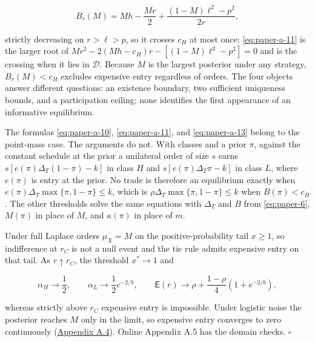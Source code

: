 \[
B_r(M)=Mh-\frac{Mr}{2}+\frac{(1-M)\ell^2-p^2}{2r},
\tag{A.13}\label{eq:paper-a-13}
\]

strictly decreasing on \(r>\ell>p\), so it crosses \(c_H\) at most once;
\eqref{eq:paper-a-11} is the larger root of
\(Mr^2-2(Mh-c_H)r-[(1-M)\ell^2-p^2]=0\) and is the crossing when it lies
in \(\mathcal D\). Because \(M\) is the largest posterior under any
strategy, \(B_r(M)<c_H\) excludes expensive entry regardless of orders.
The four objects answer different questions: an existence boundary, two
sufficient uniqueness bounds, and a participation ceiling; none
identifies the first appearance of an informative equilibrium.

The formulas \eqref{eq:paper-a-10}, \eqref{eq:paper-a-11}, and
\eqref{eq:paper-a-13} belong to the point-mass case. The arguments do
not. With classes and a prior \(\pi\), against the constant schedule at
the prior a unilateral order of size \(s\) earns
\(s[e(\pi)\Delta_T(1-\pi)-k]\) in class \(H\) and
\(s[e(\pi)\Delta_T\pi-k]\) in class \(L\), where \(e(\pi)\) is entry at
the prior. No trade is therefore an equilibrium exactly when
\(e(\pi)\Delta_T\max\{\pi,1-\pi\}\le k\), which is
\(\rho\Delta_T\max\{\pi,1-\pi\}\le k\) when \(B(\pi)<c_H\). The other
thresholds solve the same equations with \(\Delta_T\) and \(B\) from
\eqref{eq:paper-6}, \(M(\pi)\) in place of \(M\), and \(\kappa(\pi)\) in
place of \(m\).

Under full Laplace orders \(\mu_X=M\) on the positive-probability tail
\(x\ge1\), so indifference at \(r_C\) is not a null event and the tie
rule admits expensive entry on that tail. As \(r\uparrow r_C\), the
threshold \(x^*\to1\) and

\[
\alpha_H\to\frac12,\qquad\alpha_L\to\frac12e^{-2/b},\qquad
\mathsf E(r)\to\rho+\frac{1-\rho}{4}\left(1+e^{-2/b}\right),
\tag{A.14}\label{eq:paper-a-14}
\]

whereas strictly above \(r_C\) expensive entry is impossible. Under
logistic noise the posterior reaches \(M\) only in the limit, so
expensive entry converges to zero continuously
(\hyperref[pa-calculations]{Appendix A.4}). Online Appendix A.5 has the
domain checks. \(\square\)
